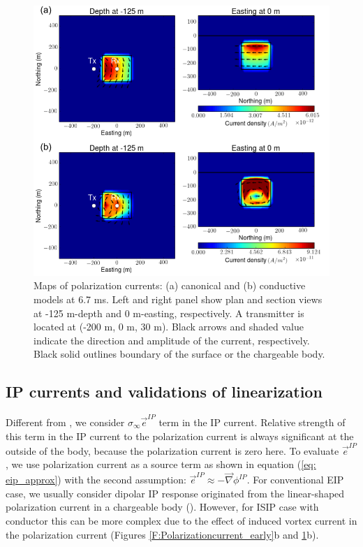 \documentclass[a4paper, 11pt]{article}
\newcommand{\grad}{\vec \nabla}
\newcommand{\siginf}{\sigma_\infty}
\newcommand {\e}  { {\vec e} }
\begin{document}
\begin{figure}[htb]
  \centering
  \includegraphics[width=1\textwidth]{figures/Polarizationcurrent_late.png}
  \caption{Maps of polarization currents: (a) canonical and (b) conductive models at 6.7 ms. Left and right panel show plan and section views at -125 m-depth and 0 m-easting, respectively. A transmitter is located at (-200 m, 0 m, 30 m). Black arrows and shaded value indicate the direction and amplitude of the current, respectively. Black solid outlines boundary of the surface or the chargeable body.}
  \label{F:Polarizationcurrent_late}
\end{figure}
\clearpage

\subsection{IP currents and validations of linearization}
Different from \cite{Smith1988a}, we consider $\siginf \e^{IP}$ term in the IP current. 
Relative strength of this term in the IP current to the polarization current is always significant at the outside of the body, because the polarization current is zero here. 
To evaluate $\e^{IP}$, we use polarization current as a source term as shown in equation (\ref{eq: eip_approx}) with the second assumption: $\e^{IP} \approx -\grad\phi^{IP}$. 
For conventional EIP case, we usually consider dipolar IP response originated from the linear-shaped polarization current in a chargeable body (\cite{seigel1959}). 
However, for ISIP case with conductor this can be more complex due to the effect of induced vortex current in the polarization current (Figures \ref{F:Polarizationcurrent_early}b and \ref{F:Polarizationcurrent_late}b). 
\end{document}
